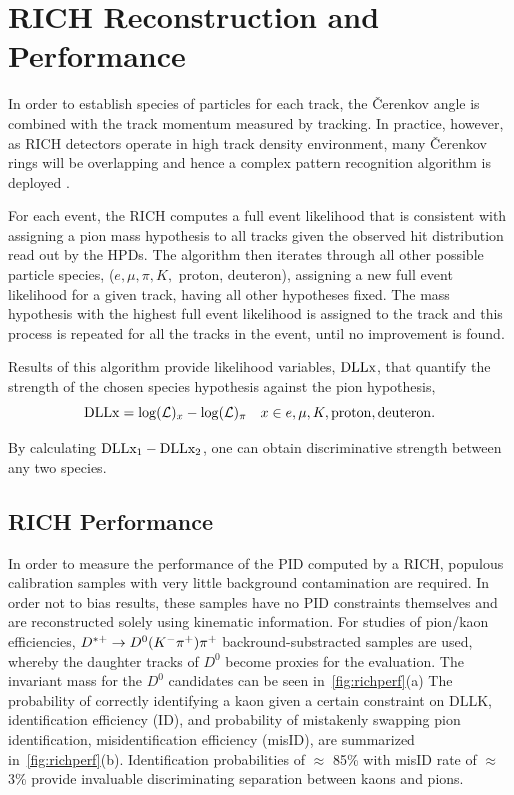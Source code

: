 \section{RICH Reconstruction and Performance }
In order to establish species of particles for each track, the \v{C}erenkov angle is combined with the track momentum measured by tracking. In practice, however, as \Gls{RICH} detectors operate in high track density environment, many \v{C}erenkov rings will be overlapping and hence a complex pattern recognition algorithm is deployed \cite{Forty:1999sg}. 


For each event, the \Gls{RICH} computes a full event likelihood that is consistent with assigning a pion mass hypothesis to all tracks given the observed hit distribution read out by the \Gls{HPD}s. The algorithm then iterates through all other possible particle species, ($e, \mu, \pi, K,$ proton, deuteron), assigning a new full event likelihood for a given track, having all other hypotheses fixed. The mass hypothesis with the highest full event likelihood is assigned to the track and this process is repeated for all the tracks in the event, until no improvement is found. 

Results of this algorithm provide likelihood variables, $\rm{\textrm{DLL{x}}}$, that quantify the strength of the chosen species hypothesis against the pion hypothesis,
\begin{equation}
	\textrm{\textrm{DLL{x}}} = \mathrm{log}(\mathcal{L})_{x} - \mathrm{log}(\mathcal{L})_{\pi} \quad  x\in{e, \mu, K, \rm{proton, deuteron}}.
\end{equation}

By calculating $\rm{DLL{x_{1}} - DLL{x_{2}}}$, one can obtain discriminative strength between any two species.

\subsection{RICH Performance}
\label{RICHperf}
In order to measure the performance of the \Gls{PID} computed by a \gls{RICH}, populous calibration samples with very little background contamination are required. In order not to bias results, these samples have no \Gls{PID} constraints themselves and are reconstructed solely using kinematic information. For studies of pion/kaon efficiencies, $D^{*+} \rightarrow D^{0}({K}^{-}{{\pi}^+}){{\pi}^+}$ backround-substracted samples are used, whereby the daughter tracks of $D^{0}$ become proxies for the evaluation. The invariant mass for the $D^{0}$ candidates can be seen in~\autoref{fig:richperf}(a) The probability of correctly identifying a kaon given a certain constraint on $\textrm{DLL{K}}$, identification efficiency (\Gls{ID}), and probability of mistakenly swapping pion identification, misidentification efficiency (\gls{misID}), are summarized in~\autoref{fig:richperf}(b). Identification probabilities of $\approx$ 85\% with misID rate of $\approx$ 3\% provide invaluable discriminating separation between kaons and pions.




